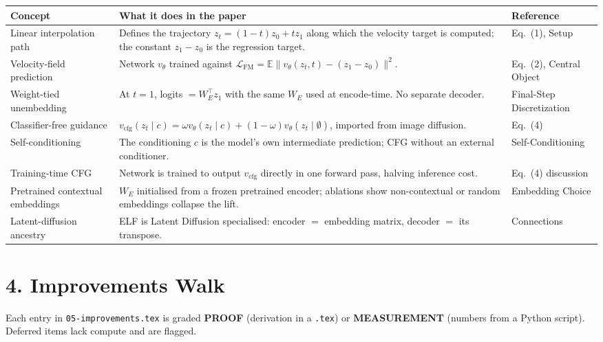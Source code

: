 \documentclass[11pt]{article}
\begin{document}
\begin{longtable}{p{}p{}p{}}
\toprule
\textbf{Concept} & \textbf{What it does in the paper} & \textbf{Reference} \\
\midrule
\endhead
Linear interpolation path & Defines the trajectory $z_t = (1-t) z_0 + t z_1$ along which the velocity target is computed; the constant $z_1 - z_0$ is the regression target. & Eq.~(1), Setup \\
Velocity-field prediction & Network $v_\theta$ trained against $\mathcal{L}_\text{FM} = \mathbb{E}\lVert v_\theta(z_t, t) - (z_1 - z_0)\rVert^2$. & Eq.~(2), Central Object \\
Weight-tied unembedding & At $t = 1$, logits $= W_E^\top z_1$ with the same $W_E$ used at encode-time. No separate decoder. & Final-Step Discretization \\
Classifier-free guidance & $v_\text{cfg}(z_t \mid c) = \omega v_\theta(z_t \mid c) + (1-\omega) v_\theta(z_t \mid \emptyset)$, imported from image diffusion. & Eq.~(4) \\
Self-conditioning & The conditioning $c$ is the model's own intermediate prediction; CFG without an external conditioner. & Self-Conditioning \\
Training-time CFG & Network is trained to output $v_\text{cfg}$ directly in one forward pass, halving inference cost. & Eq.~(4) discussion \\
Pretrained contextual embeddings & $W_E$ initialised from a frozen pretrained encoder; ablations show non-contextual or random embeddings collapse the lift. & Embedding Choice \\
Latent-diffusion ancestry & ELF is Latent Diffusion specialised: encoder $=$ embedding matrix, decoder $=$ its transpose. & Connections \\
\bottomrule
\end{longtable}

\section*{4. Improvements Walk}

Each entry in \texttt{05-improvements.tex} is graded \textbf{PROOF} (derivation in a \texttt{.tex}) or \textbf{MEASUREMENT} (numbers from a Python script). Deferred items lack compute and are flagged.
\end{document}

